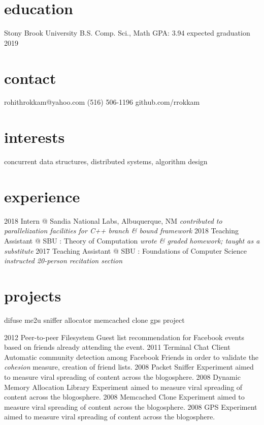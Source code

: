 \documentclass{cv}
\begin{document}

\begin{aside}
  \section{education}
    Stony Brook University
    B.S. Comp. Sci., Math
    GPA: 3.94
    expected graduation 2019
  \section{contact}
    rohithrokkam@yahoo.com
    (516) 506-1196
    github.com/rrokkam
\end{aside}

\section{interests}

concurrent data structures, distributed systems, algorithm design

\section{experience}

\begin{entrylist}
  \entry
    {2018}
    {Intern @ Sandia National Labs, Albuquerque, NM}
    {\emph{contributed to parallelization facilities for C++ branch \& bound framework}}
  \entry
    {2018}
    {Teaching Assistant @ SBU : Theory of Computation}
    {\emph{wrote \& graded homework; taught as a substitute}}
  \entry
    {2017}
    {Teaching Assistant @ SBU : Foundations of Computer Science}
    {\emph{instructed 20-person recitation section}}
\end{entrylist}

\section{projects}

difuse
me2u
sniffer
allocator
memcached clone
gps project


\begin{entrylist}
  \entry
    {2012}
    {Peer-to-peer Filesystem}
    {Guest list recommendation for Facebook events based on friends already attending the event.}
  \entry
    {2011}
    {Terminal Chat Client}
    {Automatic community detection among Facebook Friends in order to validate the \emph{cohesion} measure, creation of friend lists.}
  \entry
    {2008}
    {Packet Sniffer}
    {Experiment aimed to measure viral spreading of content across the blogosphere.}
  \entry
    {2008}
    {Dynamic Memory Allocation Library}
    {Experiment aimed to measure viral spreading of content across the blogosphere.}
  \entry
    {2008}
    {Memcached Clone}
    {Experiment aimed to measure viral spreading of content across the blogosphere.}
  \entry
    {2008}
    {GPS}
    {Experiment aimed to measure viral spreading of content across the blogosphere.}
\end{entrylist}
\end{document}
